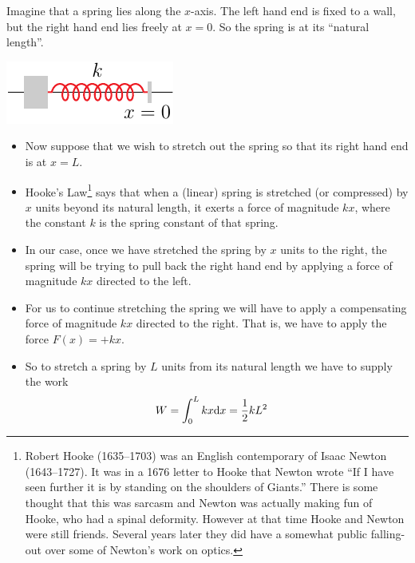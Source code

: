 \begin{eg}\label{eg:WKhookes}
Imagine that a spring lies along the $x$-axis. The left hand
end is fixed to a wall, but the right hand end lies freely at
$x=0$. So the spring is at its ``natural length''.
\begin{efig}
\begin{center}
   \includegraphics{spring}
\end{center}
\end{efig}
\begin{itemize}
 \item Now suppose that we wish to stretch out the spring so that its
right hand end is at $x=L$.

\item Hooke's Law\footnote{Robert Hooke (1635--1703) was an English contemporary of
Isaac Newton (1643--1727). It was in a 1676 letter to Hooke that Newton wrote
``If I have seen further it is by standing on the  shoulders of Giants.'' There is some
thought that this was sarcasm and Newton was actually making fun of Hooke,
who had a spinal deformity. However at that time Hooke and Newton were still friends.
Several years later they did have a somewhat public falling-out over some of Newton's work
on optics.} says that when a (linear) spring is stretched (or
compressed) by $x$ units beyond its natural length, it exerts a force of
magnitude $kx$, where the constant $k$ is the spring constant of that spring.

\item In our case, once we have stretched the spring by $x$ units to
the right, the spring will be trying to pull back the right hand
end by applying a force of magnitude $kx$ directed to the left.

\item For us to continue stretching the spring we will have to apply
a compensating force of magnitude $kx$ directed to the right. That is, we have to apply
the force $F(x) = +kx$.

\item So to stretch a spring by $L$ units from its natural length we have to supply the
work
\begin{align*}
W &=\int_0^L k x\mathrm{d}x =\frac{1}{2}kL^2
\end{align*}
\end{itemize}
\end{eg}


